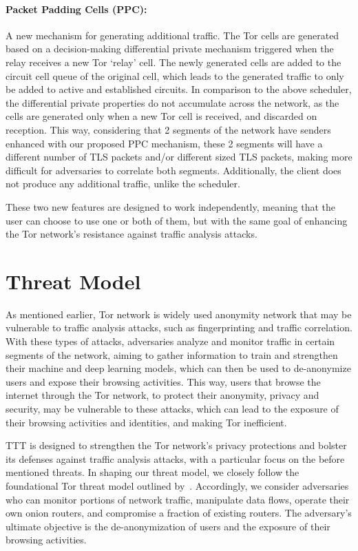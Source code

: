 \paragraph{Packet Padding Cells (PPC):} A new mechanism for generating additional traffic. The Tor cells are generated based on a decision-making differential private mechanism triggered when the relay receives a new Tor `relay' cell. The newly generated cells are added to the circuit cell queue of the original cell, which leads to the generated traffic to only be added to active and established circuits.  In comparison to the above scheduler, the differential private properties do not accumulate across the network, as the cells are generated only when a new Tor cell is received, and discarded on reception. This way, considering that 2 segments of the network have senders enhanced with our proposed PPC mechanism, these 2 segments will have a different number of TLS packets and/or different sized TLS packets, making more difficult for adversaries to correlate both segments. Additionally, the client does not produce any additional traffic, unlike the scheduler.

These two new features are designed to work independently, meaning that the user can choose to use one or both of them, but with the same goal of enhancing the Tor network's resistance against traffic analysis attacks.


\section{Threat Model}\label{sec:threat_model}

As mentioned earlier, Tor network is widely used anonymity network that may be vulnerable to traffic analysis attacks, such as fingerprinting and traffic correlation. With these types of attacks, adversaries analyze and monitor traffic in certain segments of the network, aiming to gather information to train and strengthen their machine and deep learning models, which can then be used to de-anonymize users and expose their browsing activities. This way, users that browse the internet through the Tor network, to protect their anonymity, privacy and security, may be vulnerable to these attacks, which can lead to the exposure of their browsing activities and identities, and making Tor inefficient. 

TTT is designed to strengthen the Tor network's privacy protections and bolster its defenses against traffic analysis attacks, with a particular focus on the before mentioned threats. In shaping our threat model, we closely follow the foundational Tor threat model outlined by~\cite{dingledine2004tor}. Accordingly, we consider adversaries who can monitor portions of network traffic, manipulate data flows, operate their own onion routers, and compromise a fraction of existing routers. The adversary's ultimate objective is the de-anonymization of users and the exposure of their browsing activities.

